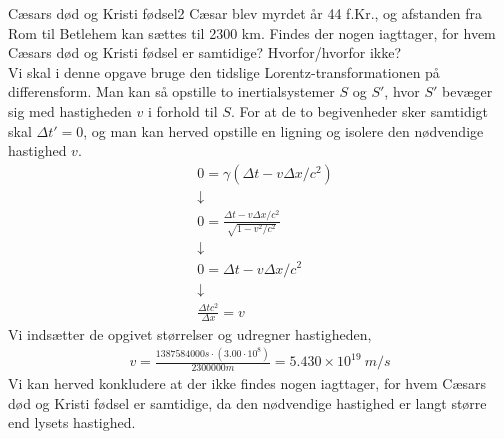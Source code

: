 \documentclass[crop=false, class=memoir]{standalone}
\begin{document}
\begin{opgave}{Cæsars død og Kristi fødsel}{2}
	Cæsar blev myrdet år 44 f.Kr., og afstanden fra Rom til Betlehem kan sættes til 2300 km.
	\opg Findes der nogen iagttager, for hvem Cæsars død og Kristi fødsel er samtidige? Hvorfor/hvorfor ikke?\\
	
	Vi skal i denne opgave bruge den tidslige Lorentz-transformationen på differensform. Man kan så opstille to inertialsystemer $S$ og $S'$, hvor $S'$ bevæger sig med hastigheden $v$ i forhold til $S$. For at de to begivenheder sker samtidigt skal $\Delta t'=0$, og man kan herved opstille en ligning og isolere den nødvendige hastighed $v$.
	\begin{align*}
		&0=\gamma(\Delta t-v\Delta x/c^2) \\
		&\downarrow \\
		&0=\frac{\Delta t-v\Delta x/c^2}{\sqrt{1-v^2/c^2}} \\
		&\downarrow \\
		&0=\Delta t-v\Delta x/c^2 \\
		&\downarrow \\
		&\frac{\Delta tc^2}{\Delta x}=v
	\end{align*}
	Vi indsætter de opgivet størrelser og udregner hastigheden,
	\begin{align*}
		v=\frac{1387584000 s \cdot (3.00\cdot 10^8)}{2300000 m}=5.430 \times 10^{19}  \ \si{m/s}
	\end{align*}
	Vi kan herved konkludere at der ikke findes nogen iagttager, for hvem Cæsars død og Kristi fødsel er samtidige, da den nødvendige hastighed er langt større end lysets hastighed.
\end{opgave}
\end{document}

